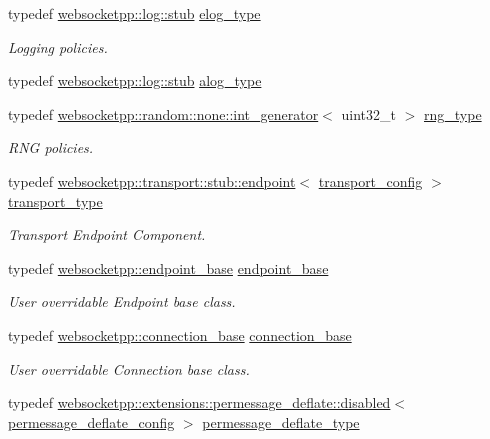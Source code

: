 \begin{DoxyCompactItemize}
typedef \hyperlink{classwebsocketpp_1_1log_1_1stub}{websocketpp\+::log\+::stub} \hyperlink{structwebsocketpp_1_1config_1_1minimal__server_ab8a516661fb2ddd3a3c377823b623c1a}{elog\+\_\+type}
\begin{DoxyCompactList}\small\item\em Logging policies. \end{DoxyCompactList}\item 
typedef \hyperlink{classwebsocketpp_1_1log_1_1stub}{websocketpp\+::log\+::stub} \hyperlink{structwebsocketpp_1_1config_1_1minimal__server_a9296068cfeabe4786e08691cd755f9b3}{alog\+\_\+type}
\item 
typedef \hyperlink{classwebsocketpp_1_1random_1_1none_1_1int__generator}{websocketpp\+::random\+::none\+::int\+\_\+generator}$<$ uint32\+\_\+t $>$ \hyperlink{structwebsocketpp_1_1config_1_1minimal__server_a7f3520a016124fc86f907bcf934f74f2}{rng\+\_\+type}
\begin{DoxyCompactList}\small\item\em R\+N\+G policies. \end{DoxyCompactList}\item 
typedef \hyperlink{classwebsocketpp_1_1transport_1_1stub_1_1endpoint}{websocketpp\+::transport\+::stub\+::endpoint}$<$ \hyperlink{structwebsocketpp_1_1config_1_1minimal__server_1_1transport__config}{transport\+\_\+config} $>$ \hyperlink{structwebsocketpp_1_1config_1_1minimal__server_a6e5badb1b21e44416a801ed216a3c72e}{transport\+\_\+type}
\begin{DoxyCompactList}\small\item\em Transport Endpoint Component. \end{DoxyCompactList}\item 
typedef \hyperlink{classwebsocketpp_1_1endpoint__base}{websocketpp\+::endpoint\+\_\+base} \hyperlink{structwebsocketpp_1_1config_1_1minimal__server_ab656b89b039b38b52d0587acda673e0a}{endpoint\+\_\+base}
\begin{DoxyCompactList}\small\item\em User overridable Endpoint base class. \end{DoxyCompactList}\item 
typedef \hyperlink{classwebsocketpp_1_1connection__base}{websocketpp\+::connection\+\_\+base} \hyperlink{structwebsocketpp_1_1config_1_1minimal__server_ab58e7a2f5284bef92d724fa607515f2b}{connection\+\_\+base}
\begin{DoxyCompactList}\small\item\em User overridable Connection base class. \end{DoxyCompactList}\item 
typedef \hyperlink{classwebsocketpp_1_1extensions_1_1permessage__deflate_1_1disabled}{websocketpp\+::extensions\+::permessage\+\_\+deflate\+::disabled}$<$ \hyperlink{structwebsocketpp_1_1config_1_1minimal__server_1_1permessage__deflate__config}{permessage\+\_\+deflate\+\_\+config} $>$ \hyperlink{structwebsocketpp_1_1config_1_1minimal__server_acd4073d1c0f2da6a4b0080978117437a}{permessage\+\_\+deflate\+\_\+type}
\end{DoxyCompactItemize}
